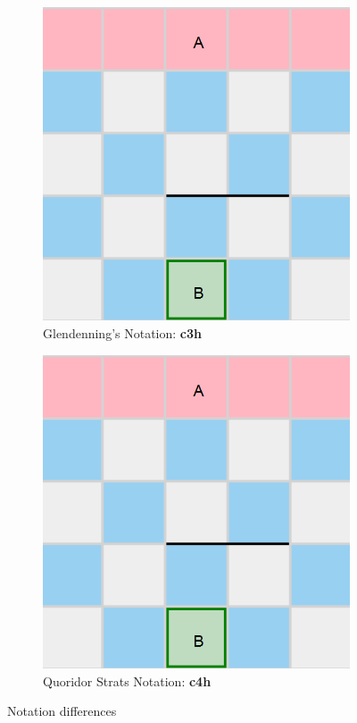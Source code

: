 \begin{figure}[h]
    \begin{subfigure}{0.4\textwidth}
      \includegraphics[width=\textwidth]{../img/GameBoard/wall_repr.png}
      \caption{Glendenning's Notation: \textbf{c3h}}
      \label{fig:NotationDifferentA}
    \end{subfigure}
    \hfill
    \begin{subfigure}{0.4\textwidth}
      \includegraphics[width=\textwidth]{../img/GameBoard/wall_repr.png}
      \caption{Quoridor Strats Notation: \textbf{c4h}}
    \end{subfigure}
    \caption{Notation differences}
    \label{fig:WallNotationsDifferent}
\end{figure}

